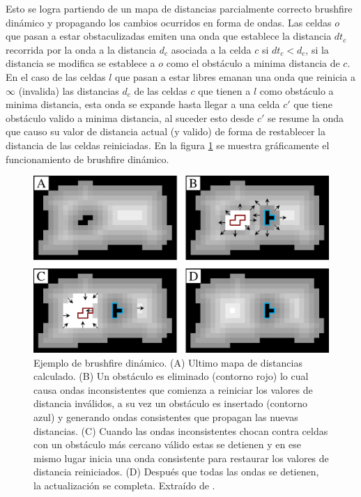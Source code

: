 Esto se logra partiendo de un mapa de distancias parcialmente correcto brushfire dinámico y propagando los cambios ocurridos en forma de ondas. Las celdas $o$ que pasan a estar obstaculizadas emiten una onda  que establece la distancia $dt_c$ recorrida por la onda a la distancia $d_c$ asociada a la celda $c$ si $dt_{c}<d_{c}$, si la distancia se modifica se establece a $o$ como el obstáculo a minima distancia de $c$. En el caso de las celdas $l$ que pasan a estar libres emanan una onda  que reinicia a $\infty$ (invalida) las distancias $d_c$ de las celdas $c$ que tienen a $l$ como obstáculo a minima distancia, esta onda se expande hasta llegar a una celda $c'$ que tiene obstáculo valido a minima distancia, al suceder esto desde $c'$ se resume la onda  que causo su valor de distancia actual (y valido) de forma de restablecer la distancia de las celdas reiniciadas. En la figura \ref{fig:wavesBrushDyn} se muestra gráficamente el funcionamiento de brushfire dinámico.

\begin{figure}[H]
  \center
  \includegraphics[width=1\linewidth]{imagenes/wavesBrushDinClean2Rows.png}
  \caption{Ejemplo de brushfire dinámico. (A) Ultimo mapa de distancias calculado. (B) Un obstáculo es eliminado (contorno rojo) lo cual causa ondas inconsistentes que comienza a reiniciar los valores de distancia inválidos, a su vez un obstáculo es insertado (contorno azul) y generando ondas consistentes que propagan las nuevas distancias. (C) Cuando las ondas inconsistentes chocan contra celdas con un obstáculo más cercano válido estas se detienen y en ese mismo lugar inicia una onda consistente para restaurar los valores de distancia reiniciados. (D) Después que todas las ondas se detienen, la actualización se completa. Extraído de \cite{Lau2013}.}\label{fig:wavesBrushDyn}
\end{figure} 

